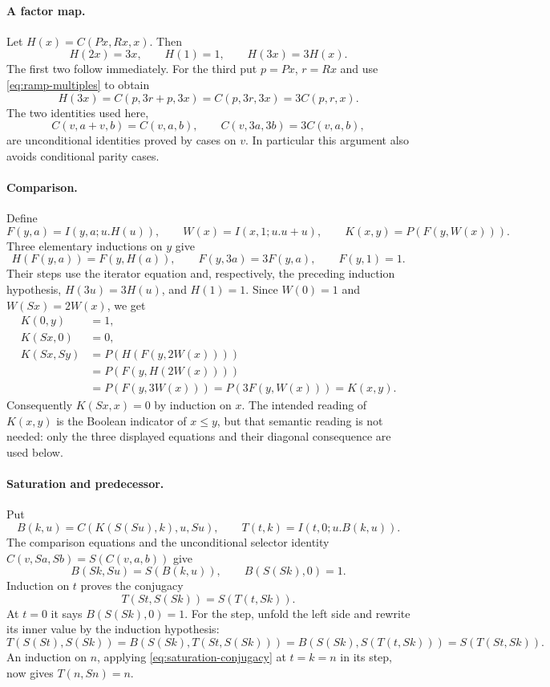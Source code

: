 \documentclass[11pt]{article}
\begin{document}
\paragraph{A factor map.}
Let $H(x)=C(Px,Rx,x)$. Then
\[
 H(2x)=3x,\qquad H(1)=1,\qquad H(3x)=3H(x).
\]
The first two follow immediately. For the third put $p=Px$, $r=Rx$ and
use \eqref{eq:ramp-multiples} to obtain
\[
 H(3x)=C(p,3r+p,3x)=C(p,3r,3x)=3C(p,r,x).
\]
The two identities used here,
\[
 C(v,a+v,b)=C(v,a,b),\qquad
 C(v,3a,3b)=3C(v,a,b),
\]
are unconditional identities proved by cases on $v$. In particular this
argument also avoids conditional parity cases.

\paragraph{Comparison.}
Define
\[
 F(y,a)=I(y,a;u.H(u)),\qquad W(x)=I(x,1;u.u+u),\qquad
 K(x,y)=P(F(y,W(x))).
\]
Three elementary inductions on $y$ give
\[
 H(F(y,a))=F(y,H(a)),\qquad
 F(y,3a)=3F(y,a),\qquad F(y,1)=1.
\]
Their steps use the iterator equation and, respectively, the preceding
induction hypothesis, $H(3u)=3H(u)$, and $H(1)=1$.
Since $W(0)=1$ and $W(Sx)=2W(x)$, we get
\begin{align*}
 K(0,y)&=1,\\
 K(Sx,0)&=0,\\
 K(Sx,Sy)
 &=P(H(F(y,2W(x))))\\
 &=P(F(y,H(2W(x))))\\
 &=P(F(y,3W(x)))
  =P(3F(y,W(x)))=K(x,y).
\end{align*}
Consequently $K(Sx,x)=0$ by induction on $x$.
The intended reading of $K(x,y)$ is the Boolean indicator of $x\leq y$,
but that semantic reading is not needed: only the three displayed equations
and their diagonal consequence are used below.

\paragraph{Saturation and predecessor.}
Put
\[
 B(k,u)=C(K(S(Su),k),u,Su),\qquad
 T(t,k)=I(t,0;u.B(k,u)).
\]
The comparison equations and the unconditional selector identity
$C(v,Sa,Sb)=S(C(v,a,b))$ give
\[
 B(Sk,Su)=S(B(k,u)),\qquad B(S(Sk),0)=1.
\]
Induction on $t$ proves the conjugacy
\begin{equation}
 T(St,S(Sk))=S(T(t,Sk)).\tag{T}\label{eq:saturation-conjugacy}
\end{equation}
At $t=0$ it says $B(S(Sk),0)=1$. For the step, unfold the left side and
rewrite its inner value by the induction hypothesis:
\[
 T(S(St),S(Sk))
 =B(S(Sk),T(St,S(Sk)))
 =B(S(Sk),S(T(t,Sk)))
 =S(T(St,Sk)).
\]
An induction on $n$, applying \eqref{eq:saturation-conjugacy} at $t=k=n$
in its step, now gives $T(n,Sn)=n$.
\end{document}
